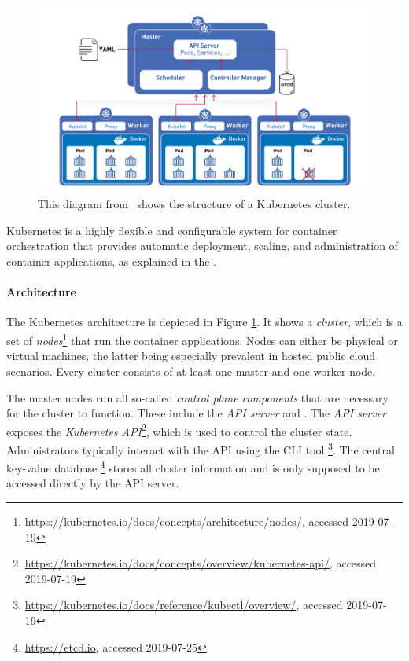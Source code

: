 \begin{figure}[H]
\begin{center}
    \includegraphics[width=0.8\linewidth]{figures/k8s_architecture.png}
    \caption[Kubernetes Architecture]{This diagram from~\textcite{k8sDiagram} shows the structure of a Kubernetes cluster.}
    \label{fig:k8sArchitecture}
\end{center}
\end{figure}


Kubernetes is a highly flexible and configurable system for container orchestration that provides automatic deployment, scaling, and administration of container applications, as explained in the \textcite{k8sdocs}. 

\paragraph{Architecture}

The Kubernetes architecture is depicted in Figure \ref{fig:k8sArchitecture}. It shows a \textit{cluster}, which is a set of \textit{nodes}\footnote{\url{https://kubernetes.io/docs/concepts/architecture/nodes/}, accessed 2019-07-19} that run the container applications. Nodes can either be physical or virtual machines, the latter being especially prevalent in hosted public cloud scenarios. Every cluster consists of at least one master and one worker node. 

The master nodes run all so-called \textit{control plane components} that are necessary for the cluster to function. These include the \textit{API server} and . The \textit{API server} exposes the \textit{Kubernetes API}\footnote{\url{https://kubernetes.io/docs/concepts/overview/kubernetes-api/}, accessed 2019-07-19}, which is used to control the cluster state. Administrators typically interact with the API using the CLI tool \footnote{\url{https://kubernetes.io/docs/reference/kubectl/overview/}, accessed 2019-07-19}. The central key-value database \footnote{\url{https://etcd.io}, accessed 2019-07-25} stores all cluster information and is only supposed to be accessed directly by the API server.

